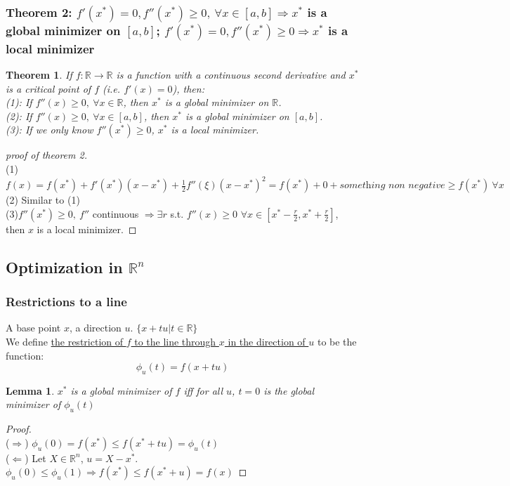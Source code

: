 \documentclass[11pt,a4paper]{article}
\newtheorem{theorem}{Theorem}
\newtheorem{lemma}{Lemma}
\begin{document}
\subsubsection{Theorem 2: $f'(x^*)=0, f''(x^*)\geq 0,\ \forall x\in [a,b]\Rightarrow x^*$ is a global minimizer on $[a,b]$; $f'(x^*)=0, f''(x^*)\geq 0 \Rightarrow x^*$ is a local minimizer}
\begin{theorem}
    If $f:\mathbb{R} \rightarrow \mathbb{R}$ is a function with a continuous second derivative and $x^*$ is a critical point of $f$ (i.e. $f'(x)=0$), then:\\
    (1): If $f''(x)\geq 0,\ \forall x\in\mathbb{R}$, then $x^*$ is a global minimizer on $\mathbb{R}$.\\
    (2): If $f''(x)\geq 0,\ \forall x\in[a,b]$, then $x^*$ is a global minimizer on $[a,b]$.\\
    (3): If we only know $f''(x^*)\geq 0$, $x^*$ is a local minimizer.
\end{theorem}
\begin{proof}[proof of theorem 2]
\quad\\
(1)$f(x)=f(x^*)+f'(x^*)(x-x^*)+\frac{1}{2}f''(\xi)(x-x^*)^2=f(x^*)+0+\textit{something non negative}\geq f(x^*)\  \forall x$\\
(2) Similar to (1)\\
(3)$f''(x^*)\geq 0,\ f''$ continuous $\Rightarrow \exists r$ s.t. $f''(x)\geq 0$ $\forall x\in[x^*-\frac{r}{2},x^*+\frac{r}{2}]$, then $x$ is a local minimizer.
\end{proof}


\subsection{Optimization in $\mathbb{R}^n$}
\subsubsection{Restrictions to a line}
A base point $x$, a direction $u$. $\{x+tu| t\in \mathbb{R}\}$\\
We define \underline{the restriction of $f$ to the line through $x$ in the direction of $u$} to be the function:
$$\phi_u (t)=f(x+tu)$$
\begin{lemma}
$x^*$ is a global minimizer of $f$ iff for all $u$, $t=0$ is the global minimizer of $\phi_u (t)$
\end{lemma}
\begin{proof}
\quad\\
($\Rightarrow$) $\phi_u (0)=f(x^*)\leq f(x^*+tu)=\phi_u (t)$\\
($\Leftarrow$) Let $X\in \mathbb{R}^n$, $u=X-x^*$. $\phi_u (0)\leq \phi_u (1) \Rightarrow f(x^*)\leq f(x^*+u)=f(x)$
\end{proof}
\end{document}
